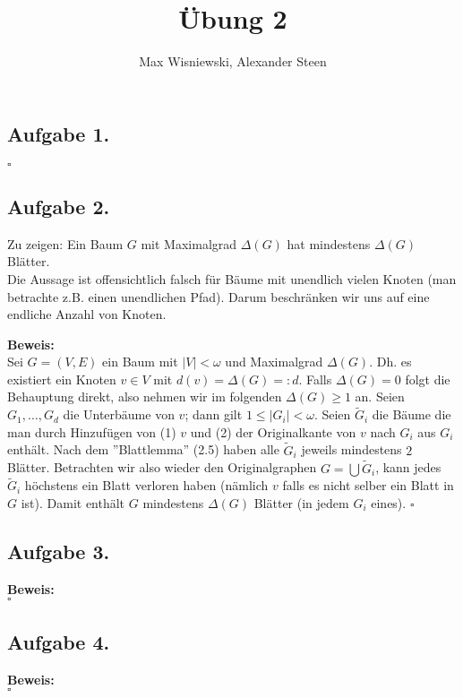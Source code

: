 \documentclass[11pt,a4paper,ngerman]{article}
\date{}
\title{Übung 2}
\author{Max Wisniewski, Alexander Steen}
\begin{document}

\renewcommand{\figurename}{Figure}

\maketitle
\thispagestyle{fancy}

\subsection*{Aufgabe 1.}
\mbox{}\hfill$\square$

\subsection*{Aufgabe 2.}
Zu zeigen: Ein Baum $G$ mit Maximalgrad $\Delta(G)$ hat mindestens $\Delta(G)$ Blätter.\\
Die Aussage ist offensichtlich falsch für Bäume mit unendlich vielen Knoten (man betrachte z.B.
einen unendlichen Pfad). Darum beschränken wir uns auf eine endliche Anzahl von Knoten.

\textbf{Beweis:}\\
Sei $G=(V,E)$ ein Baum mit $|V| < \omega$ und Maximalgrad $\Delta(G)$.
Dh. es existiert ein Knoten $v \in V$ mit $d(v) = \Delta(G) =: d$. 
Falls $\Delta(G) = 0$
folgt die Behauptung direkt, also nehmen wir im folgenden $\Delta(G) \geq 1$ an.
Seien $G_1,\ldots,G_d$ die Unterbäume von $v$; dann gilt $1\leq |G_i| < \omega$. 
Seien $\tilde{G}_i$ die Bäume die man durch Hinzufügen von
(1) $v$ und (2) der Originalkante von $v$ nach $G_i$ aus $G_i$ enthält.
Nach dem ''Blattlemma'' (2.5) haben alle $\tilde{G}_i$ jeweils mindestens $2$ Blätter.
Betrachten wir also wieder den Originalgraphen $G = \bigcup \tilde{G}_i$, kann jedes
$\tilde{G}_i$ höchstens ein Blatt verloren haben (nämlich $v$ falls es nicht selber ein Blatt in $G$ ist). 
Damit enthält $G$ mindestens $\Delta(G)$ Blätter (in jedem $G_i$ eines).
\mbox{}\hfill$\square$

\subsection*{Aufgabe 3.}
\textbf{Beweis:}\\
\mbox{}\hfill$\square$

\subsection*{Aufgabe 4.}

\textbf{Beweis:}\\

\mbox{}\hfill$\square$

\label{LastPage}
\end{document}

